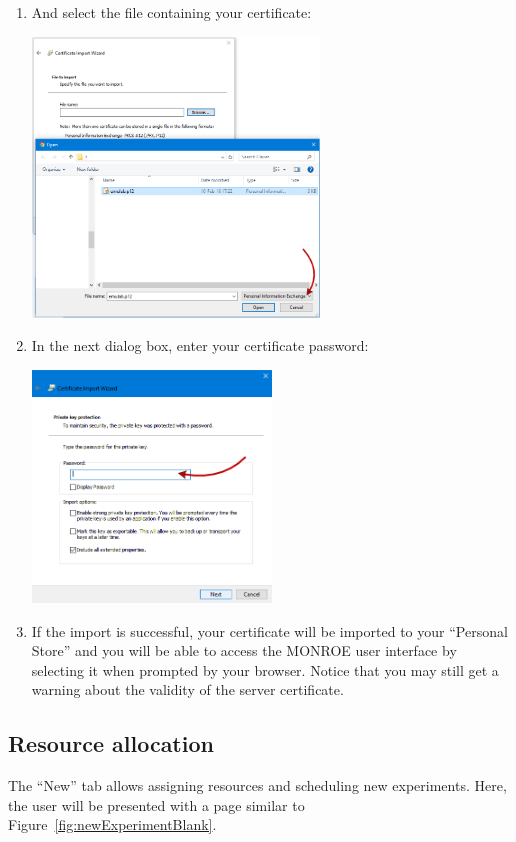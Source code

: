 \documentclass[a4paper,10pt]{article}
\newcommand{\monroe}{MONROE}
\begin{document}
\begin{enumerate}
	\item And select the file containing your certificate:\\
	\begin{center}\includegraphics[width=0.6\textwidth]{InstallCert07.png}\end{center}
	
	\item In the next dialog box, enter your certificate password:\\
	\begin{center}\centering\includegraphics[width=0.5\textwidth]{InstallCert08.png}\end{center}
	
	\item If the import is successful, your certificate will be imported to your ``Personal Store'' and you will be able to access the \monroe{} user interface by selecting it when prompted by your browser. Notice that you may still get a warning about the validity of the server certificate.
	
\end{enumerate}

\FloatBarrier
\subsection{Resource allocation}
\label{subsec:resourceAllocation}
The ``New'' tab allows assigning resources and scheduling new experiments.
Here, the user will be presented with a page similar to Figure~\ref{fig:newExperimentBlank}.
\end{document}
